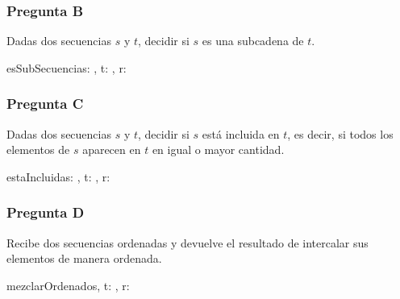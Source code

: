 \subsubsection{Pregunta B}

Dadas dos secuencias $s$ y $t$, decidir si $s$ es una subcadena de $t$.

\begin{proc}{esSubSecuencia}{\In s: , \In t: , \Out r: \bool}{}
\end{proc}

\subsubsection{Pregunta C}

Dadas dos secuencias $s$ y $t$, decidir si $s$ está incluida en $t$, es decir, si todos los elementos de $s$ aparecen en $t$ en igual o mayor cantidad.

\begin{proc}{estaIncluida}{\In s: , \In t: , \Out r: \bool}{}
\end{proc}

\subsubsection{Pregunta D}

Recibe dos secuencias ordenadas y devuelve el resultado de intercalar sus elementos de manera ordenada.


\begin{proc}{mezclarOrdenado}{\In s, t: \TLista{\ent}, \Out r: \TLista{\ent}}{}
\end{proc}

